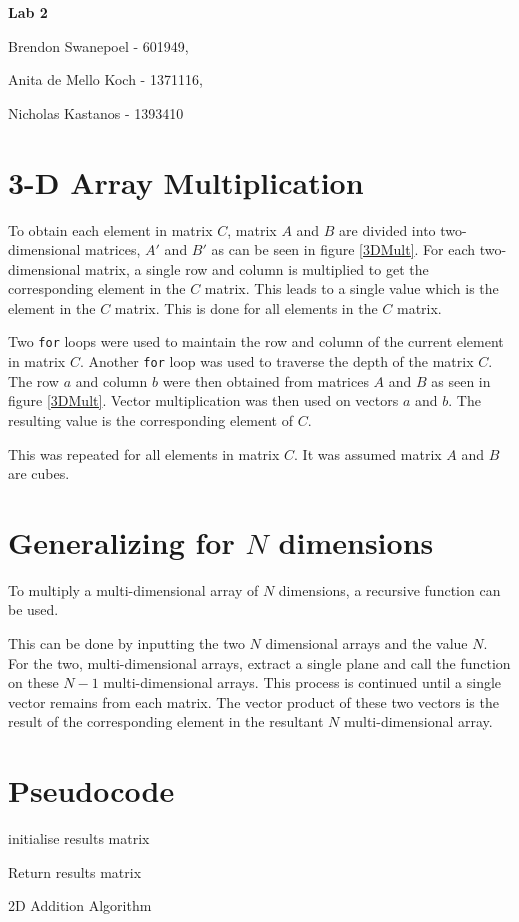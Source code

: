 \documentclass[a4paper,10pt]{article}
\begin{document}
{\LARGE{\centerline{\bf Lab 2}}}
{\Large{\centerline{Brendon Swanepoel - 601949,}
\centerline{ Anita de Mello Koch - 1371116,} 
\centerline{Nicholas Kastanos - 1393410}}}

\section{3-D Array Multiplication}

To obtain each element in matrix $C$, matrix $A$ and $B$ are divided into two-dimensional matrices, $A'$ and $B'$ as can be seen in figure \ref{3DMult}.
For each two-dimensional matrix, a single row and column is multiplied to get the corresponding element in the $C$ matrix.
This leads to a single value which is the element in the $C$ matrix.
This is done for all elements in the $C$ matrix.


Two \texttt{for} loops were used to maintain the row and column of the current element in matrix $C$.
Another \texttt{for} loop was used to traverse the depth of the matrix $C$.
The row $a$ and column $b$ were then obtained from matrices $A$ and $B$ as seen in figure \ref{3DMult}.
Vector multiplication was then used on vectors $a$ and $b$.
The resulting value is the corresponding element of $C$.

This was repeated for all elements in matrix $C$.
It was assumed matrix $A$ and $B$ are cubes.

\section{Generalizing for $N$ dimensions}

To multiply a multi-dimensional array of $N$ dimensions, a recursive function can be used.

This can be done by inputting the two $N$ dimensional arrays and the value $N$.
For the two, multi-dimensional arrays, extract a single plane and call the function on these $N-1$ multi-dimensional arrays.
This process is continued until a single vector remains from each matrix.
The vector product of these two vectors is the result of the corresponding element in the resultant $N$ multi-dimensional array.

\section{Pseudocode}

\begin{algorithm}[H]
	\SetAlgoLined
	initialise results matrix\; 

	Return results matrix\;
\caption{2D Addition Algorithm}
\end{algorithm}
\end{document}
